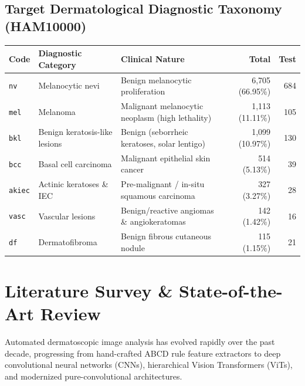 \documentclass[12pt,a4paper]{article}
\begin{document}
\subsection{Target Dermatological Diagnostic Taxonomy (HAM10000)}
\begin{table}[h!]
\centering
\renewcommand{\arraystretch}{1.2}
\begin{tabularx}{\textwidth}{l l X r r}
\toprule
\textbf{Code} & \textbf{Diagnostic Category} & \textbf{Clinical Nature} & \textbf{Total} & \textbf{Test} \\
\midrule
\texttt{nv} & Melanocytic nevi & Benign melanocytic proliferation & 6,705 (66.95\%) & 684 \\
\texttt{mel} & Melanoma & Malignant melanocytic neoplasm (high lethality) & 1,113 (11.11\%) & 105 \\
\texttt{bkl} & Benign keratosis-like lesions & Benign (seborrheic keratoses, solar lentigo) & 1,099 (10.97\%) & 130 \\
\texttt{bcc} & Basal cell carcinoma & Malignant epithelial skin cancer & 514 (5.13\%) & 39 \\
\texttt{akiec} & Actinic keratoses \& IEC & Pre-malignant / in-situ squamous carcinoma & 327 (3.27\%) & 28 \\
\texttt{vasc} & Vascular lesions & Benign/reactive angiomas \& angiokeratomas & 142 (1.42\%) & 16 \\
\texttt{df} & Dermatofibroma & Benign fibrous cutaneous nodule & 115 (1.15\%) & 21 \\
\bottomrule
\end{tabularx}
\end{table}

\section{Literature Survey \& State-of-the-Art Review}
Automated dermatoscopic image analysis has evolved rapidly over the past decade, progressing from hand-crafted ABCD rule feature extractors to deep convolutional neural networks (CNNs), hierarchical Vision Transformers (ViTs), and modernized pure-convolutional architectures.
\end{document}
